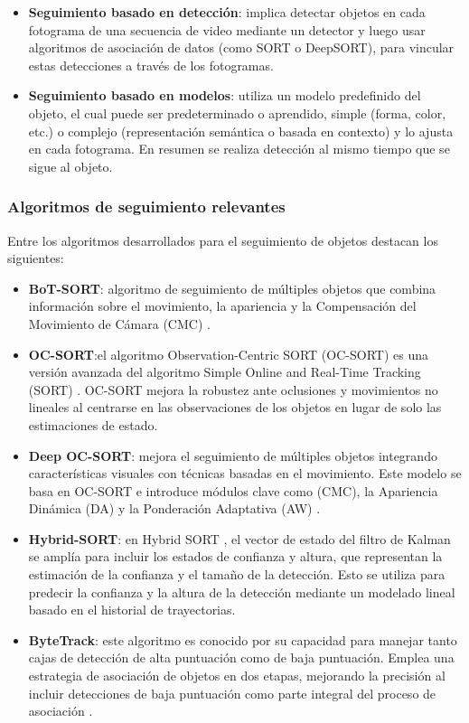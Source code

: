 \begin{itemize}
    \item \textbf{Seguimiento basado en detección}: implica detectar objetos en cada fotograma de una secuencia de video mediante un detector y luego usar algoritmos de asociación de datos (como SORT o DeepSORT), para vincular estas detecciones a través de los fotogramas. 

    \item \textbf{Seguimiento basado en modelos}: utiliza un modelo predefinido del objeto, el cual puede ser predeterminado o aprendido, simple (forma, color, etc.) o complejo (representación semántica o basada en contexto) y lo ajusta en cada fotograma. En resumen se realiza detección al mismo tiempo que se sigue al objeto.
\end{itemize}

\subsubsection{Algoritmos de seguimiento relevantes}
Entre los algoritmos desarrollados para el seguimiento de objetos destacan los siguientes:
\begin{itemize}
    \item \textbf{BoT-SORT}: algoritmo de seguimiento de múltiples objetos que combina información sobre el movimiento, la apariencia y la Compensación del Movimiento de Cámara (CMC) \cite{BotSORT}.

    \item \textbf{OC-SORT}:el algoritmo Observation-Centric SORT (OC-SORT) \cite{OCSORT} es una versión avanzada del algoritmo Simple Online and Real-Time Tracking (SORT) \cite{SORT}. OC-SORT mejora la robustez ante oclusiones y movimientos no lineales al centrarse en las observaciones de los objetos en lugar de solo las estimaciones de estado.

    \item \textbf{Deep OC-SORT}: mejora el seguimiento de múltiples objetos integrando características visuales con técnicas basadas en el movimiento. Este modelo se basa en OC-SORT e introduce módulos clave como (CMC), la Apariencia Dinámica (DA) y la Ponderación Adaptativa (AW) \cite{DeepOCSORT}.

    \item \textbf{Hybrid-SORT}: en Hybrid SORT \cite{HybridSORT}, el vector de estado del filtro de Kalman se amplía para incluir los estados de confianza y altura, que representan la estimación de la confianza y el tamaño de la detección. Esto se utiliza para predecir la confianza y la altura de la detección mediante un modelado lineal basado en el historial de trayectorias.

    \item \textbf{ByteTrack}: este algoritmo es conocido por su capacidad para manejar tanto cajas de detección de alta puntuación como de baja puntuación. Emplea una estrategia de asociación de objetos en dos etapas, mejorando la precisión al incluir detecciones de baja puntuación como parte integral del proceso de asociación \cite{ByteTrack}.
\end{itemize}

